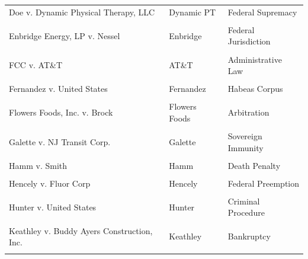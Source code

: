 \documentclass[
  12pt,
]{article}
\begin{document}
\begin{longtable}[t]{>{\raggedright\arraybackslash}p{5in}>{\centering\arraybackslash}p{3in}>{\centering\arraybackslash}p{3in}}
Doe v. Dynamic Physical Therapy, LLC & Dynamic PT & Federal Supremacy\\
\cellcolor{gray!10}{Ellingburg v. United States} & \cellcolor{gray!10}{Ellingburg} & \cellcolor{gray!10}{Criminal Sentencing}\\
Enbridge Energy, LP v. Nessel & Enbridge & Federal Jurisdiction\\
\cellcolor{gray!10}{Exxon Mobil Corp. v. Corporacion Cimex, S.A.} & \cellcolor{gray!10}{Exxon} & \cellcolor{gray!10}{Foreign Sovereign Immunity}\\
FCC v. AT\&T & AT\&T & Administrative Law\\
\cellcolor{gray!10}{FS Credit Opportunities Corp. v. Saba Capital Master Fund} & \cellcolor{gray!10}{FS Credit} & \cellcolor{gray!10}{Securities Law}\\
Fernandez v. United States & Fernandez & Habeas Corpus\\
\cellcolor{gray!10}{First Choice Women's Resource Centers v. Davenport} & \cellcolor{gray!10}{First Choice} & \cellcolor{gray!10}{Freedom of Association}\\
Flowers Foods, Inc. v. Brock & Flowers Foods & Arbitration\\
\cellcolor{gray!10}{GEO Group, Inc. v. Menocal} & \cellcolor{gray!10}{GEO Group} & \cellcolor{gray!10}{Federal Jurisdiction}\\
Galette v. NJ Transit Corp. & Galette & Sovereign Immunity\\
\cellcolor{gray!10}{Hain Celestial Group v. Palmquist} & \cellcolor{gray!10}{Hain Celestial Grp.} & \cellcolor{gray!10}{Federal Jurisdiction}\\
Hamm v. Smith & Hamm & Death Penalty\\
\cellcolor{gray!10}{Havana Docks Corp. v. Royal Caribbean  Cruises} & \cellcolor{gray!10}{Havana Docks} & \cellcolor{gray!10}{Foreign Affairs}\\
Hencely v. Fluor Corp & Hencely & Federal Preemption\\
\cellcolor{gray!10}{Hikma Pharmaceuticals USA Inc. v. Amarin Pharma, Inc.} & \cellcolor{gray!10}{Hikma} & \cellcolor{gray!10}{Patent Law}\\
Hunter v. United States & Hunter & Criminal Procedure\\
\cellcolor{gray!10}{Jules v. Andre Balazs Properties} & \cellcolor{gray!10}{Jules} & \cellcolor{gray!10}{Arbitration}\\
Keathley v. Buddy Ayers Construction, Inc. & Keathley & Bankruptcy\\
\cellcolor{gray!10}{Klein v. Martin} & \cellcolor{gray!10}{Klein} & \cellcolor{gray!10}{Habeas Corpus}\\

\end{longtable}
\end{document}
